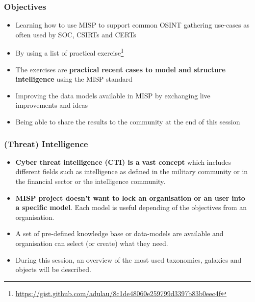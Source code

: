 
\begin{frame}[t,plain]
\titlepage
\end{frame}

\begin{frame}
\frametitle{Objectives}
\begin{itemize}
        \item Learning how to use MISP to support common OSINT gathering use-cases as often used by SOC, CSIRTs and CERTs
        \item By using a list of practical exercise\footnote{\url{https://gist.github.com/adulau/8c1de48060e259799d3397b83b0eec4f}}
        \item The exercises are {\bf practical recent cases to model and structure intelligence} using the MISP standard
        \item Improving the data models available in MISP by exchanging live improvements and ideas
        \item Being able to share the results to the community at the end of this session
\end{itemize}
\end{frame}

\begin{frame}
\frametitle{(Threat) Intelligence}
\begin{itemize}
        \item {\bf Cyber threat intelligence (CTI) is a vast concept} which includes different fields such as intelligence as defined in the military community or in the financial sector or the intelligence community.
        \item {\bf MISP project doesn't want to lock an organisation or an user into a specific model}. Each model is useful depending of the objectives from an organisation.
        \item A set of pre-defined knowledge base or data-models are available and organisation can select (or create) what they need.
        \item During this session, an overview of the most used taxonomies, galaxies and objects will be described.
\end{itemize}
\end{frame}

